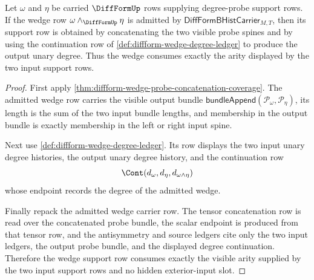 \begin{theorem}
\label{thm:diffform-degree-probe-wedge-compatibility}
Let $\omega$ and $\eta$ be carried $\DiffFormUp$ rows supplying
degree-probe support rows. If the wedge row
$\omega\wedge_{\DiffFormUp}\eta$ is admitted by
$\mathsf{DiffFormBHistCarrier}_{M,T}$, then its support row is obtained by
concatenating the two visible probe spines and by using the continuation row
of \autoref{def:diffform-wedge-degree-ledger} to produce the output unary
degree. Thus the wedge consumes exactly the arity displayed by the two input
support rows.
\end{theorem}
\begin{proof}
First apply
\autoref{thm:diffform-wedge-probe-concatenation-coverage}. The admitted wedge
row carries the visible output bundle
$\mathsf{bundleAppend}(\mathcal{P}_\omega,\mathcal{P}_\eta)$, its length is
the sum of the two input bundle lengths, and membership in the output bundle
is exactly membership in the left or right input spine.

Next use \autoref{def:diffform-wedge-degree-ledger}. Its row displays the two
input unary degree histories, the output unary degree history, and the
continuation row
$$
\Cont(d_\omega,d_\eta,d_{\omega\wedge\eta})
$$
whose endpoint records the degree of the admitted wedge.

Finally repack the admitted wedge carrier row. The tensor concatenation row is
read over the concatenated probe bundle, the scalar endpoint is produced from
that tensor row, and the antisymmetry and source ledgers cite only the two
input ledgers, the output probe bundle, and the displayed degree continuation.
Therefore the wedge support row consumes exactly the visible arity supplied by
the two input support rows and no hidden exterior-input slot.
\end{proof}
